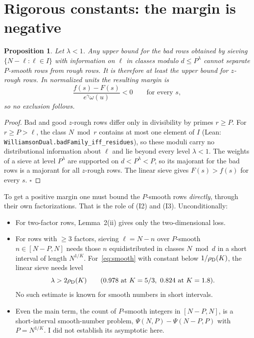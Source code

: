 \documentclass[11pt,a4paper]{article}
\newtheorem{proposition}{Proposition}
\theoremstyle{remark}
\begin{document}
\section{Rigorous constants: the margin is negative}
\begin{proposition}\label{prop:negative}
Let $\lambda<1$. Any upper bound for the bad rows obtained by sieving $\{N-\ell:\ell\in I\}$ with
information on $\ell$ in classes modulo $d\le P^\lambda$ cannot separate $P$-smooth rows from rough rows.
It is therefore at least the upper bound for $z$-rough rows. In normalized units the resulting margin
is
\[
\frac{f(s)-F(s)}{e^\gamma\omega(u)}<0\qquad\text{for every } s,
\]
so no exclusion follows.
\end{proposition}
\begin{proof}
Bad and good $z$-rough rows differ only in divisibility by primes $r\ge P$. For $r\ge P>\ell$, the class
$N\bmod r$ contains at most one element of $I$ (Lean: \texttt{WilliamsonDual.badFamily\_iff\_residues}),
so these moduli carry no distributional information about $\ell$ and lie beyond every level $\lambda<1$.
The weights of a sieve at level $P^\lambda$ are supported on $d<P^\lambda<P$, so its majorant for the bad
rows is a majorant for all $z$-rough rows. The linear sieve gives $F(s)>f(s)$ for every $s$. $\square$
\end{proof}

To get a positive margin one must bound the $P$-smooth rows \emph{directly}, through their own
factorizations. That is the role of (I2) and (I3). Unconditionally:
\begin{itemize}
\item For two-factor rows, Lemma~2(ii) gives only the two-dimensional loss.
\item For rows with $\ge3$ factors, sieving $\ell=N-n$ over $P$-smooth $n\in[N-P,N]$ needs those $n$
equidistributed in classes $N\bmod d$ in a short interval of length $N^{1/K}$. For~\eqref{eq:smooth}
with constant below $1/\rho_{\rm D}(K)$, the linear sieve needs level
\[
\lambda>2\rho_{\rm D}(K)\qquad(0.978 \text{ at } K=5/3,\ 0.824 \text{ at } K=1.8).
\]
No such estimate is known for smooth numbers in short intervals.
\item Even the main term, the count of $P$-smooth integers in $[N-P,N]$, is a short-interval smooth-number
problem, $\Psi(N,P)-\Psi(N-P,P)$ with $P=N^{1/K}$. I did not establish its asymptotic here.
\end{itemize}
\end{document}
